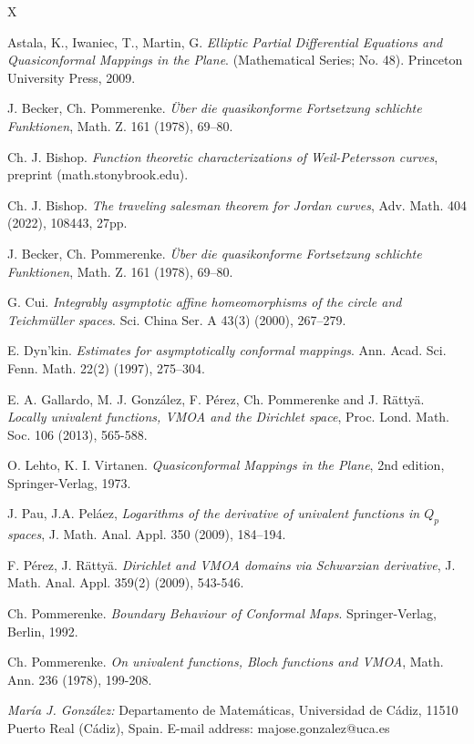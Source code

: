 \documentclass[12pt,a4paper]{article}
\theoremstyle{definition}
\theoremstyle{remark}
\numberwithin{komcounter}{section}
\begin{document}
\begin{thebibliography}{X}



 
 
 Astala, K., Iwaniec, T., Martin, G.  \emph{Elliptic Partial Differential Equations and Quasiconformal Mappings in the Plane}. (Mathematical Series; No. 48). Princeton University Press, 2009.

 J. Becker, Ch. Pommerenke. \emph{\"Uber die quasikonforme Fortsetzung schlichte Funktionen}, Math. Z. 161 (1978), 69–80.

 
  Ch. J. Bishop. \emph{Function theoretic characterizations of Weil-Petersson curves}, preprint (math.stonybrook.edu).
 
  Ch. J. Bishop. \emph{The traveling salesman theorem for Jordan curves}, Adv. Math. 404 (2022), 108443, 27pp.
 
 
 
 J. Becker, Ch. Pommerenke. \emph{\"Uber die quasikonforme Fortsetzung schlichte Funktionen}, Math. Z. 161 (1978), 69–80.

 G. Cui. \emph{ Integrably asymptotic affine homeomorphisms of the circle and Teichm\"uller spaces}. Sci. China Ser. A  43(3) (2000), 267–279.



 E. Dyn’kin. \emph{Estimates for asymptotically conformal mappings}. Ann. Acad. Sci. Fenn. Math. 22(2) (1997), 275–304.

E. A. Gallardo, M. J. Gonz\'alez, F. P\'erez, Ch. Pommerenke and J. R\"atty\"a.
\emph{Locally univalent functions, VMOA and the Dirichlet space}, Proc. Lond. Math. Soc. 106 (2013),
565-588.

 O. Lehto, K. I. Virtanen. \emph{Quasiconformal Mappings in the Plane}, 2nd edition, Springer-Verlag, 1973.

 J. Pau, J.A. Peláez, \emph{Logarithms of the derivative of univalent functions in $Q_p$ spaces}, J. Math. Anal. Appl. 350 (2009), 184–194.

 F. P\'erez,  J. R\"atty\"a. \emph{Dirichlet and VMOA domains via Schwarzian derivative}, J.  Math. Anal.  Appl.  359(2) (2009), 543-546.

 Ch. Pommerenke. \emph{Boundary Behaviour of Conformal Maps}. Springer-Verlag, Berlin, 1992.

 Ch. Pommerenke. \emph{On univalent functions, Bloch functions and VMOA}, Math. Ann. 236 (1978), 199-208.













\end{thebibliography}


\textit{Mar\'ia J. Gonz\'alez:} Departamento de Matem\'aticas, Universidad de C\'adiz, 11510 Puerto Real (C\'adiz), Spain. E-mail address: majose.gonzalez@uca.es
\end{document}
